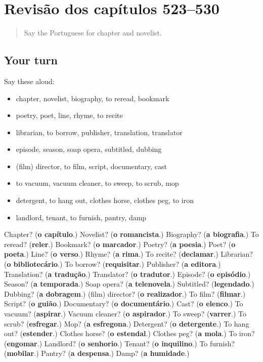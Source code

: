 \section[(dialogue)]{Revisão dos capítulos 523–530}

\label{lesson:PT-R530-revisao-523-530}



\begin{quote}
Say the Portuguese for chapter and novelist.
\end{quote}

\subsection*{Your turn}
Say these aloud:

\begin{itemize}
\raggedright
  \item chapter, novelist, biography, to reread, bookmark
  \item poetry, poet, line, rhyme, to recite
  \item librarian, to borrow, publisher, translation, translator
  \item episode, season, soap opera, subtitled, dubbing
  \item (film) director, to film, script, documentary, cast
  \item to vacuum, vacuum cleaner, to sweep, to scrub, mop
  \item detergent, to hang out, clothes horse, clothes peg, to iron
  \item landlord, tenant, to furnish, pantry, damp
\end{itemize}

\begin{tcolorbox}[breakable,colback=teal!4,colframe=teal!35!black,title={Before you move on}]
Chapter? (\textbf{o capítulo}.) Novelist? (\textbf{o romancista}.) Biography? (\textbf{a biografia}.) To reread? (\textbf{reler}.) Bookmark? (\textbf{o marcador}.) Poetry? (\textbf{a poesia}.) Poet? (\textbf{o poeta}.) Line? (\textbf{o verso}.) Rhyme? (\textbf{a rima}.) To recite? (\textbf{declamar}.) Librarian? (\textbf{o bibliotecário}.) To borrow? (\textbf{requisitar}.) Publisher? (\textbf{a editora}.) Translation? (\textbf{a tradução}.) Translator? (\textbf{o tradutor}.) Episode? (\textbf{o episódio}.) Season? (\textbf{a temporada}.) Soap opera? (\textbf{a telenovela}.) Subtitled? (\textbf{legendado}.) Dubbing? (\textbf{a dobragem}.) (film) director? (\textbf{o realizador}.) To film? (\textbf{filmar}.) Script? (\textbf{o guião}.) Documentary? (\textbf{o documentário}.) Cast? (\textbf{o elenco}.) To vacuum? (\textbf{aspirar}.) Vacuum cleaner? (\textbf{o aspirador}.) To sweep? (\textbf{varrer}.) To scrub? (\textbf{esfregar}.) Mop? (\textbf{a esfregona}.) Detergent? (\textbf{o detergente}.) To hang out? (\textbf{estender}.) Clothes horse? (\textbf{o estendal}.) Clothes peg? (\textbf{a mola}.) To iron? (\textbf{engomar}.) Landlord? (\textbf{o senhorio}.) Tenant? (\textbf{o inquilino}.) To furnish? (\textbf{mobilar}.) Pantry? (\textbf{a despensa}.) Damp? (\textbf{a humidade}.)
\end{tcolorbox}
